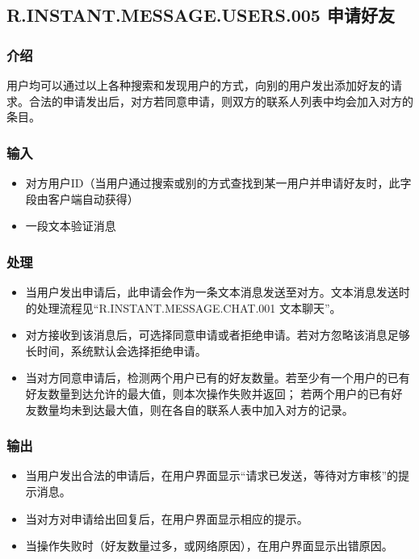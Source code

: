 \subsection{R.INSTANT.MESSAGE.USERS.005 申请好友}
\subsubsection{介绍}
用户均可以通过以上各种搜索和发现用户的方式，向别的用户发出添加好友的请求。合法的申请发出后，对方若同意申请，则双方的联系人列表中均会加入对方的条目。
\subsubsection{输入}
\begin{itemize}
	\item 对方用户ID（当用户通过搜索或别的方式查找到某一用户并申请好友时，此字段由客户端自动获得）
	\item 一段文本验证消息
\end{itemize}
\subsubsection{处理}
\begin{itemize}
	\item 当用户发出申请后，此申请会作为一条文本消息发送至对方。文本消息发送时的处理流程见“R.INSTANT.MESSAGE.CHAT.001 文本聊天”。
	\item 对方接收到该消息后，可选择同意申请或者拒绝申请。若对方忽略该消息足够长时间，系统默认会选择拒绝申请。
	\item 当对方同意申请后，检测两个用户已有的好友数量。若至少有一个用户的已有好友数量到达允许的最大值，则本次操作失败并返回；
	若两个用户的已有好友数量均未到达最大值，则在各自的联系人表中加入对方的记录。
\end{itemize}
\subsubsection{输出}
\begin{itemize}
	\item 当用户发出合法的申请后，在用户界面显示“请求已发送，等待对方审核”的提示消息。
	\item 当对方对申请给出回复后，在用户界面显示相应的提示。
	\item 当操作失败时（好友数量过多，或网络原因），在用户界面显示出错原因。
\end{itemize}

